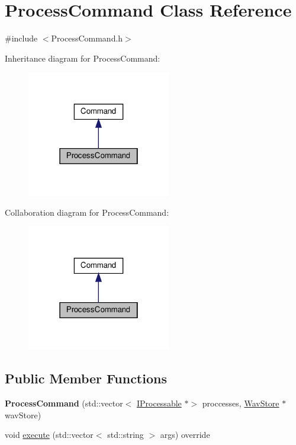 \hypertarget{classProcessCommand}{}\section{Process\+Command Class Reference}
\label{classProcessCommand}


{\ttfamily \#include $<$Process\+Command.\+h$>$}



Inheritance diagram for Process\+Command\+:
\nopagebreak
\begin{figure}[H]
\begin{center}
\leavevmode
\includegraphics[width=178pt]{d8/d69/classProcessCommand__inherit__graph}
\end{center}
\end{figure}


Collaboration diagram for Process\+Command\+:
\nopagebreak
\begin{figure}[H]
\begin{center}
\leavevmode
\includegraphics[width=178pt]{d9/d1f/classProcessCommand__coll__graph}
\end{center}
\end{figure}
\subsection*{Public Member Functions}
\begin{DoxyCompactItemize}
\item 
\mbox{\label{classProcessCommand_a6fa4eeb8ead41b34e74a4d76ea928e52}} 
{\bfseries Process\+Command} (std\+::vector$<$ \hyperlink{classIProcessable}{I\+Processable} $\ast$$>$ proccesses, \hyperlink{classWavStore}{Wav\+Store} $\ast$wav\+Store)
\item 
void \hyperlink{classProcessCommand_a2a1eda1ad6ea134baf1dcc19a0966222}{execute} (std\+::vector$<$ std\+::string $>$ args) override
\end{DoxyCompactItemize}


